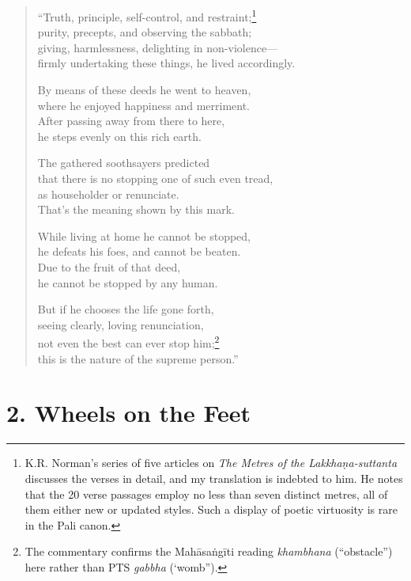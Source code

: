 \documentclass[12pt,openany]{book}%
\begin{document}
\begin{verse}%
“Truth, principle, self-control, and restraint;\footnote{K.R. Norman’s series of five articles on \emph{The Metres of the \textsanskrit{Lakkhaṇa}-suttanta} discusses the verses in detail, and my translation is indebted to him. He notes that the 20 verse passages employ no less than seven distinct metres, all of them either new or updated styles. Such a display of poetic virtuosity is rare in the Pali canon. } \\
purity, precepts, and observing the sabbath; \\
giving, harmlessness, delighting in non-violence—\\
firmly undertaking these things, he lived accordingly. 

By means of these deeds he went to heaven, \\
where he enjoyed happiness and merriment. \\
After passing away from there to here, \\
he steps evenly on this rich earth. 

The gathered soothsayers predicted \\
that there is no stopping one of such even tread, \\
as householder or renunciate. \\
That’s the meaning shown by this mark. 

While living at home he cannot be stopped, \\
he defeats his foes, and cannot be beaten. \\
Due to the fruit of that deed, \\
he cannot be stopped by any human. 

But if he chooses the life gone forth, \\
seeing clearly, loving renunciation, \\
not even the best can ever stop him;\footnote{The commentary confirms the \textsanskrit{Mahāsaṅgīti} reading \textit{khambhana} (“obstacle”) here rather than PTS \textit{gabbha} (‘womb”). } \\
this is the nature of the supreme person.” 

%
\end{verse}

\section*{2. Wheels on the Feet }
\end{document}

